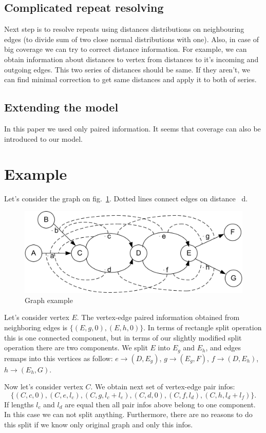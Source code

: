 \documentclass[12pt,a4paper,oneside]{article}
\begin{document}
\subsection{Complicated repeat resolving}
Next step is to resolve repeats using distances distributions on neighbouring edges (to divide sum of two close normal distributions with one). Also, in case of big coverage we can try to correct distance information. For example, we can obtain information about distances to vertex from distances to it's incoming and outgoing edges. This two series  of distances should be same. If they aren't, we can find minimal correction to get same distances and apply it to both of series.    
\subsection{Extending the model}
  In this paper we used only paired information. It seems that coverage can also be introduced to our model.
\section{Example}
Let's consider the graph on fig.~\ref{fig1}. Dotted lines connect edges on
distance ~d.
\begin{figure}
\begin{center}\includegraphics{jpg/Paired_Example.jpg}\end{center}
\caption{Graph example}
\label{fig1}
\end{figure}
Let's consider vertex $E$. The vertex-edge paired information obtained
from neighboring edges is $\{(E,g, 0),(E,h,0)\}$. In terms of rectangle
split operation this is one connected component, but in terms of our
slightly modified split operation there are two components. We split $E$
into $E_g$ and $E_h$, and edges remaps into this vertices as follow:
$e \rightarrow (D, E_g)$, $g \rightarrow (E_g,F)$, $f \rightarrow (D,E_h)$, $h \rightarrow (E_h, G)$.

Now let's consider vertex $C$. We obtain next set of vertex-edge pair
infos: $$\{(C,c,0), (C,e,l_c), (C,g,l_c+l_e), (C,d,0), (C,f,l_d),
(C,h,l_d+l_f)\}.$$ If lengths $l_c$ and $l_d$ are equal then all pair infos
above belong to one component. In this case we can not split anything.
Furthermore, there are no reasons to do this split if we know only
original graph and only this infos.
\end{document}
